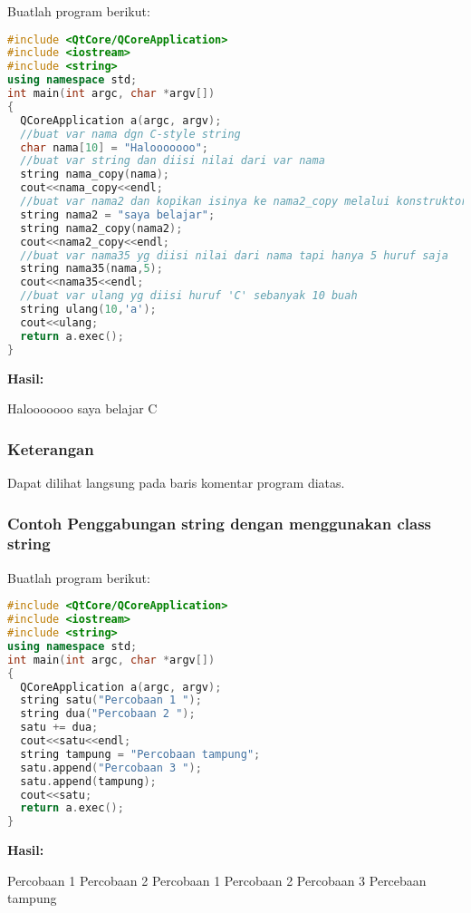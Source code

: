 Buatlah program berikut:

\begin{lstlisting}[language=c++, caption=Penggunaan class string untuk manipulasi data, label=contoh3-26]
#include <QtCore/QCoreApplication>
#include <iostream>
#include <string>
using namespace std;
int main(int argc, char *argv[])
{
  QCoreApplication a(argc, argv);
  //buat var nama dgn C-style string
  char nama[10] = "Halooooooo";
  //buat var string dan diisi nilai dari var nama
  string nama_copy(nama);
  cout<<nama_copy<<endl;
  //buat var nama2 dan kopikan isinya ke nama2_copy melalui konstruktor
  string nama2 = "saya belajar";
  string nama2_copy(nama2);
  cout<<nama2_copy<<endl;
  //buat var nama35 yg diisi nilai dari nama tapi hanya 5 huruf saja
  string nama35(nama,5);
  cout<<nama35<<endl;
  //buat var ulang yg diisi huruf 'C' sebanyak 10 buah
  string ulang(10,'a');
  cout<<ulang;
  return a.exec();
}
\end{lstlisting}

\textbf{Hasil:}

 \begin{lcverbatim}
 Halooooooo
 saya belajar
 C
 \end{lcverbatim}

\subsubsection*{Keterangan}

Dapat dilihat langsung pada baris komentar program diatas.

\subsubsection*{Contoh  Penggabungan string dengan menggunakan class string}

Buatlah program berikut:

\begin{lstlisting}[language=c++, caption=Penggabungan string dengan menggunakan class string, label=contoh3-27]
#include <QtCore/QCoreApplication>
#include <iostream>
#include <string>
using namespace std;
int main(int argc, char *argv[])
{
  QCoreApplication a(argc, argv);
  string satu("Percobaan 1 ");
  string dua("Percobaan 2 ");
  satu += dua;
  cout<<satu<<endl;
  string tampung = "Percobaan tampung";
  satu.append("Percobaan 3 ");
  satu.append(tampung);
  cout<<satu;
  return a.exec();
}
\end{lstlisting}

\textbf{Hasil:}
\begin{lcverbatim}
Percobaan 1 Percobaan 2
Percobaan 1 Percobaan 2 Percobaan 3 Percebaan tampung
\end{lcverbatim}


